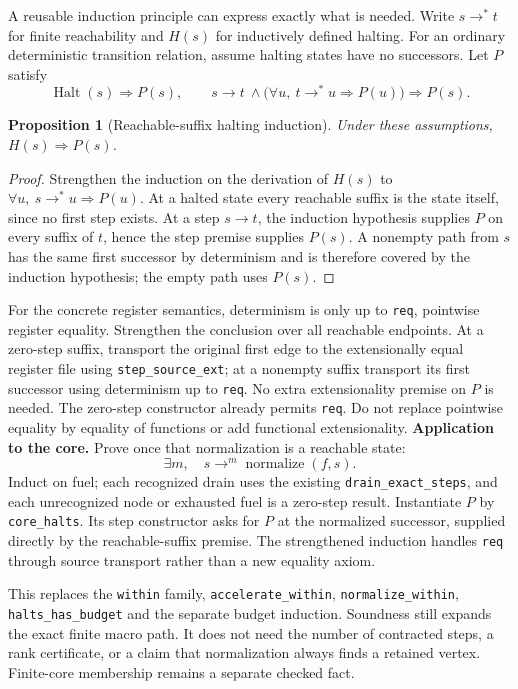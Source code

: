 \documentclass[10pt]{article}
\newtheorem{proposition}{Proposition}
\newcommand{\code}[1]{\texttt{#1}}
\begin{document}
A reusable induction principle can express exactly what is needed. Write $s\to^*t$ for finite reachability and $H(s)$ for inductively defined halting. For an ordinary deterministic transition relation, assume halting states have no successors. Let $P$ satisfy
\[
\operatorname{Halt}(s)\Rightarrow P(s),
\qquad
s\to t\ \land\bigl(\forall u,\ t\to^*u\Rightarrow P(u)\bigr)
\Rightarrow P(s).
\]
\begin{proposition}[Reachable-suffix halting induction]
Under these assumptions, $H(s)\Rightarrow P(s)$.
\end{proposition}
\begin{proof}
Strengthen the induction on the derivation of $H(s)$ to
$\forall u,\ s\to^*u\Rightarrow P(u)$. At a halted state every reachable suffix is the state itself, since no first step exists. At a step $s\to t$, the induction hypothesis supplies $P$ on every suffix of $t$, hence the step premise supplies $P(s)$. A nonempty path from $s$ has the same first successor by determinism and is therefore covered by the induction hypothesis; the empty path uses $P(s)$.
\end{proof}
For the concrete register semantics, determinism is only up to \code{req}, pointwise register equality. Strengthen the conclusion over all reachable endpoints. At a zero-step suffix, transport the original first edge to the extensionally equal register file using \code{step\_source\_ext}; at a nonempty suffix transport its first successor using determinism up to \code{req}. No extra extensionality premise on $P$ is needed. The zero-step constructor already permits \code{req}. Do not replace pointwise equality by equality of functions or add functional extensionality.
\newpage
\textbf{Application to the core.} Prove once that normalization is a reachable state:
\[
\exists m,\quad s\to^{m}\operatorname{normalize}(f,s).
\]
Induct on fuel; each recognized drain uses the existing \code{drain\_exact\_steps}, and each unrecognized node or exhausted fuel is a zero-step result. Instantiate $P$ by \code{core\_halts}. Its step constructor asks for $P$ at the normalized successor, supplied directly by the reachable-suffix premise. The strengthened induction handles \code{req} through source transport rather than a new equality axiom.

This replaces the \code{within} family, \code{accelerate\_within},
\code{normalize\_within}, \code{halts\_has\_budget} and the separate budget induction.
Soundness still expands the exact finite macro path. It does not need the number of contracted steps, a rank certificate, or a claim that normalization always finds a retained vertex. Finite-core membership remains a separate checked fact.
\end{document}
